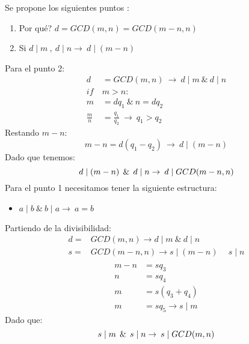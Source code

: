 Se propone los siguientes puntos \cite{Gcd2011}:
\begin{enumerate}
 \item \textquestiondown Por qu\'e? $d=GCD(m,n)=GCD(m-n,n)$
 \item Si $ d\mid m\: ,\: d\mid n \rightarrow \: d\mid (m-n)$ 
\end{enumerate}
Para el punto 2:
\begin{equation*}
 \begin{align}
  d&=GCD(m,n)\: \rightarrow \: d\mid m \:\&\:d\mid n\\
  if\:&m>n:\\
  m&=dq_1 \: \& \: n=dq_2 \\
  \frac{m}{n} &=\frac{q_1}{q_2} \: \rightarrow \: q_1>q_2
 \end{align}
\end{equation*}
Restando $m-n$:
\begin{equation}
 m-n=d(q_1-q_2)\: \rightarrow \: d\mid (m-n)
\end{equation}
Dado que tenemos:
\begin{equation}
 d \mid (m-n) \:\:\&\:\: d\mid n \rightarrow \:d\mid GCD(m-n,n) \\
\end{equation}
Para el punto 1 necesitamos tener la siguiente estructura:
\begin{itemize}
 \item $a\mid b \:\&\:b\mid a\rightarrow\:a=b$
\end{itemize}
Partiendo de la divisibilidad:
\begin{equation*}
 \begin{align}
  d=&GCD(m,n) \rightarrow d\mid m \:\&\: d\mid n \\
  s=&GCD(m-n,n) \rightarrow s\mid(m-n) \:&\: s\mid n \\
 \end{align}
\end{equation*}
\begin{equation*}
 \begin{align}
  m-n&=sq_3\\
  n&=sq_4\\
  m&=s(q_3+q_4)\\
  m&=sq_5 \rightarrow s\mid m
 \end{align}
\end{equation*}
Dado que:
\begin{equation}
  s \mid m \:\:\&\:\: s\mid n \rightarrow \:s\mid GCD(m,n) \\
\end{equation}
